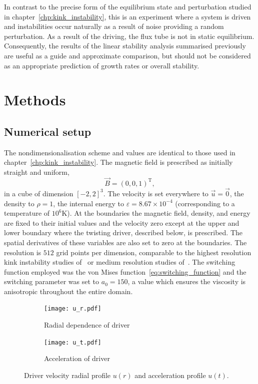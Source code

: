In contrast to the precise form of the equilibrium state and perturbation studied in chapter~\ref{chp:kink_instability}, this is an experiment where a system is driven and instabilities occur naturally as a result of noise providing a random perturbation. As a result of the driving, the flux tube is not in static equilibrium. Consequently, the results of the linear stability analysis summarised previously are useful as a guide and approximate comparison, but should not be considered as an appropriate prediction of growth rates or overall stability.

\section{Methods}

\subsection{Numerical setup}

The nondimensionalisation scheme and values are identical to those used in chapter~\ref{chp:kink_instability}. The magnetic field is prescribed as initially straight and uniform,
\begin{equation}
\vec{B} = (0, 0, 1)^{\text{T}},
\end{equation}
in a cube of dimension $[-2,2]^3$. The velocity is set everywhere to $\vec{u} = \vec{0}$, the density to $\rho = 1$, the internal energy to $\varepsilon = 8.67\times 10^{-4}$ (corresponding to a temperature of $10^6$K). At the boundaries the magnetic field, density, and energy are fixed to their initial values and the velocity zero except at the upper and lower boundary where the twisting driver, described below, is prescribed. The spatial derivatives of these variables are also set to zero at the boundaries. The resolution is $512$ grid points per dimension, comparable to the highest resolution kink instability studies of~\cite{hoodCoronalHeatingMagnetic2009} or medium resolution studies of~\cite{barefordShockHeatingNumerical2015}. The switching function employed was the von Mises function~\ref{eq:switching_function} and the switching parameter was set to $a_0 = 150$, a value which ensures the viscosity is anisotropic throughout the entire domain. 

\begin{figure}[t]
  \centering
  \begin{subfigure}{.49\textwidth}
  \centering
  \texttt{[image: u\_r.pdf]}
  \caption{Radial dependence of driver}
  \label{fig:kink_radial_driver}
  \end{subfigure}
  \begin{subfigure}{.49\textwidth}
  \centering
  \texttt{[image: u\_t.pdf]}
  \caption{Acceleration of driver}
  \label{fig:kink_driver_accel}
  \end{subfigure}
  
  \caption{Driver velocity radial profile $u(r)$ and acceleration profile $u(t)$.}
  \label{fig:kink_driver}
\end{figure}

